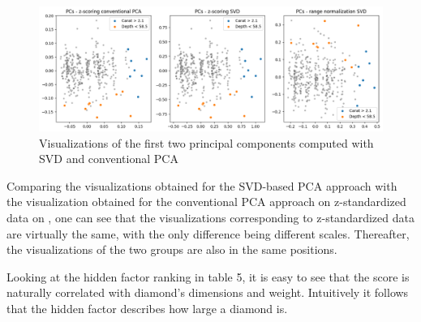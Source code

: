 \documentclass[12pt,a4paper]{article}
\begin{document}
	\begin{figure}[hbtp]
		\centering
		\includegraphics[width=.9\textwidth]{media/pcaConvComp.png}
		\caption{Visualizations of the first two principal components computed with SVD and conventional PCA}
		\label{fig:pcaConvComp}
	\end{figure}
	
	Comparing the visualizations obtained for the SVD-based PCA approach with the visualization obtained for the conventional PCA approach on z-standardized data on , one can see that the visualizations corresponding to z-standardized data are virtually the same, with the only difference being different scales. Thereafter, the visualizations of the two groups are also in the same positions.
	
	Looking at the hidden factor ranking in table 5, it is easy to see that the score is naturally correlated with diamond's dimensions and weight. Intuitively it follows that the hidden factor describes how large a diamond is.
	
\end{document}

